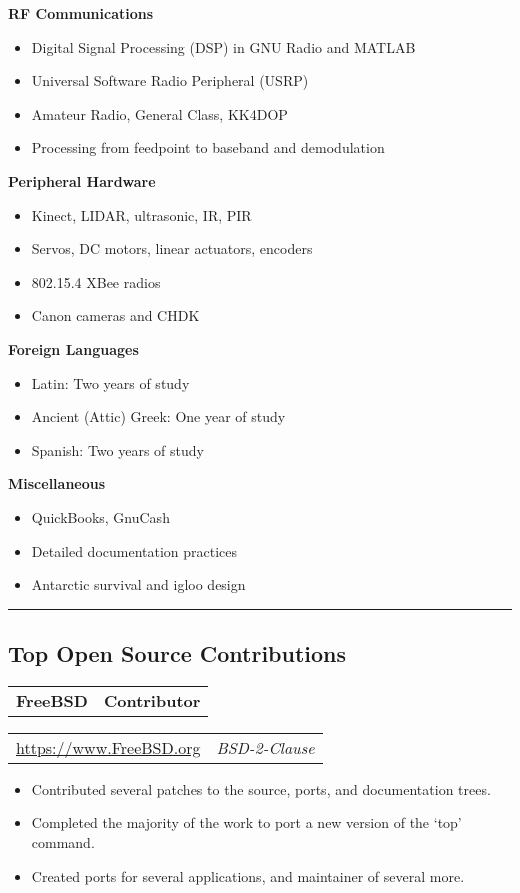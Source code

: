 \documentclass[10pt,letterpaper]{article}
\newcommand{\headerrow}[2]{%
    \begin{tabularx}{\linewidth}{Xr}
	    #1 & #2 \\
    \end{tabularx}
}
\begin{document}
    \textbf{RF Communications}
    \begin{itemize}[label=--]
        \item Digital Signal Processing (DSP) in GNU Radio and MATLAB
        \item Universal Software Radio Peripheral (USRP)
        \item Amateur Radio, General Class, KK4DOP
        \item Processing from feedpoint to baseband and demodulation
    \end{itemize}
    \textbf{Peripheral Hardware}
    \begin{itemize}[label=--]
        \item Kinect, LIDAR, ultrasonic, IR, PIR
        \item Servos, DC motors, linear actuators, encoders
        \item 802.15.4 XBee radios
        \item Canon cameras and CHDK
    \end{itemize}
    \textbf{Foreign Languages}
    \begin{itemize}[label=--]
        \item Latin: Two years of study
        \item Ancient (Attic) Greek: One year of study
        \item Spanish: Two years of study
    \end{itemize}
    \textbf{Miscellaneous}
    \begin{itemize}[label=--]
        \item QuickBooks, GnuCash
        \item Detailed documentation practices
        \item Antarctic survival and igloo design
    \end{itemize}

\vspace{2pt}
\hrule
\vspace{-0.4em}
\subsection*{Top Open Source Contributions}
    \headerrow{\textbf{FreeBSD}}{\textbf{Contributor}}
    \headerrow{\url{https://www.FreeBSD.org}}{\textit{BSD-2-Clause}}
    \begin{itemize}[label=--]
        \item Contributed several patches to the source, ports, and
            documentation trees.

        \item Completed the majority of the work to port a new version of
            the `top' command.

        \item Created ports for several applications, and maintainer of
            several more.
    \end{itemize}
\end{document}
